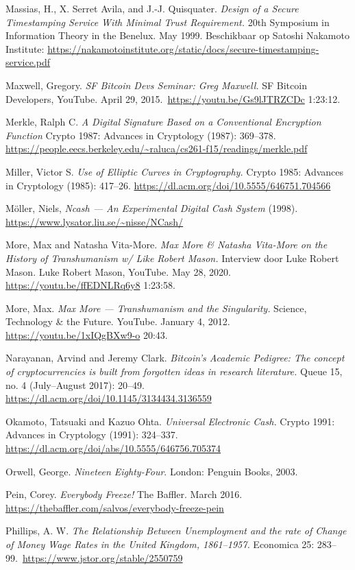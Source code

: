 \documentclass[
  a5paper,
  smalldemyvopaper,11pt,twoside,onecolumn,openright,extrafontsizes,
hidelinks]{memoir}
\begin{document}
{Massias, H., X. Serret Avila, and J.-J. Quisquater. \emph{Design of a
Secure Timestamping Service With Minimal Trust Requirement.} 20th
Symposium in Information Theory in the Benelux. May 1999. Beschikbaar op
Satoshi Nakamoto Institute:
\url{https://nakamotoinstitute.org/static/docs/secure-timestamping-service.pdf}

Maxwell, Gregory. \emph{SF Bitcoin Devs Seminar: Greg Maxwell.} SF
Bitcoin Developers, YouTube. April 29,
2015.~\url{https://youtu.be/Gs9lJTRZCDc} 1:23:12.

Merkle, Ralph C. \emph{A Digital Signature Based on a Conventional
Encryption Function} Crypto 1987: Advances in Cryptology (1987):
369--378.
\url{https://people.eecs.berkeley.edu/~raluca/cs261-f15/readings/merkle.pdf}

Miller, Victor S. \emph{Use of Elliptic Curves in Cryptography.} Crypto
1985: Advances in Cryptology (1985): 417--26.
\url{https://dl.acm.org/doi/10.5555/646751.704566}

Möller, Niels, \emph{Ncash --- An Experimental Digital Cash System}
(1998). \url{https://www.lysator.liu.se/~nisse/NCash/}

More, Max and Natasha Vita-More. \emph{Max More \& Natasha Vita-More on
the History of Transhumanism w/ Like Robert Mason.} Interview door Luke
Robert Mason. Luke Robert Mason, YouTube. May 28, 2020.
\url{https://youtu.be/ffEDNLRq6y8} 1:23:58.

More, Max. \emph{Max More --- Transhumanism and the Singularity.}
Science, Technology \& the Future. YouTube. January 4, 2012.
\url{https://youtu.be/1xIQgBXw9-o} 20:43.

Narayanan, Arvind and Jeremy Clark. \emph{Bitcoin's Academic Pedigree:
The concept of cryptocurrencies is built from forgotten ideas in
research literature.} Queue 15, no. 4 (July--August 2017): 20--49.
\url{https://dl.acm.org/doi/10.1145/3134434.3136559}

Okamoto, Tatsuaki and Kazuo Ohta. \emph{Universal Electronic Cash.}
Crypto 1991: Advances in Cryptology (1991): 324--337.
\url{https://dl.acm.org/doi/abs/10.5555/646756.705374}

Orwell, George. \emph{Nineteen Eighty-Four}. London: Penguin Books,
2003.

Pein, Corey. \emph{Everybody Freeze!} The Baffler. March 2016.
\url{https://thebaffler.com/salvos/everybody-freeze-pein}

Phillips, A. W. \emph{The Relationship Between Unemployment and the rate
of Change of Money Wage Rates in the United Kingdom, 1861--1957.}
Economica 25: 283--99.~\url{https://www.jstor.org/stable/2550759}

}
\end{document}
